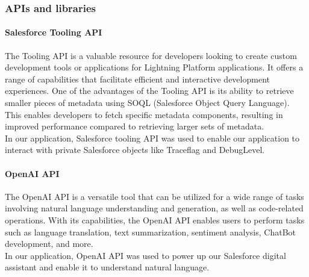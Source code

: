\subsubsection{APIs and libraries}
\paragraph*{Salesforce Tooling API}
The Tooling API is a valuable resource for developers looking to create custom development tools or applications for Lightning Platform applications. It offers a range of capabilities that facilitate efficient and interactive development experiences.
One of the advantages of the Tooling API is its ability to retrieve smaller pieces of metadata using SOQL (Salesforce Object Query Language). This enables developers to fetch specific metadata components, resulting in improved performance compared to retrieving larger sets of metadata. \\
In our application, Salesforce tooling API was used to enable our application to interact with private Salesforce objects like Traceflag and DebugLevel.

\paragraph*{OpenAI API}
The OpenAI API is a versatile tool that can be utilized for a wide range of tasks involving natural language understanding and generation, as well as code-related operations. With its capabilities, the OpenAI API enables users to perform tasks such as language translation, text summarization, sentiment analysis, ChatBot development, and more.\\
In our application, OpenAI API was used to power up our Salesforce digital assistant and enable it to understand natural language.

